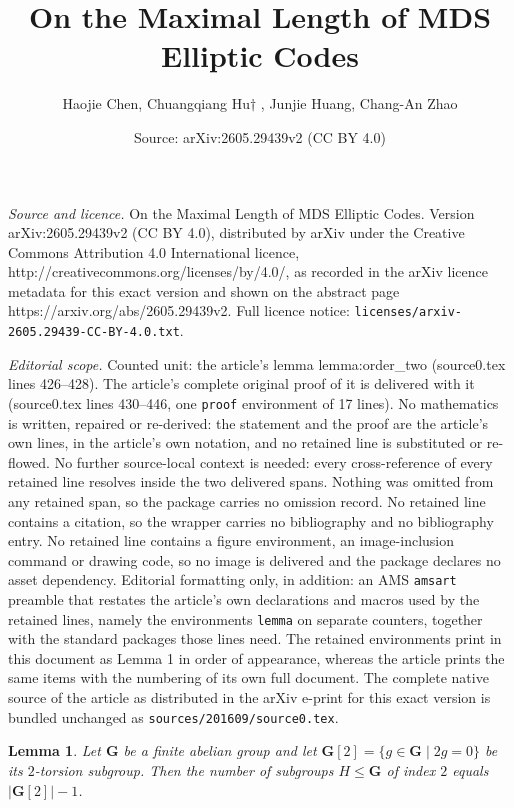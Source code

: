 \documentclass[10pt,a4paper]{amsart}
\title{On the Maximal Length of MDS Elliptic Codes}
\author{Haojie Chen, Chuangqiang Hu\(\dagger\) , Junjie Huang, Chang-An Zhao}
\date{Source: arXiv:2605.29439v2 (CC BY 4.0)}
\newtheorem{lemma}{Lemma}
\begin{document}
\maketitle

\noindent\emph{Source and licence.} On the Maximal Length of MDS Elliptic Codes. Version arXiv:2605.29439v2 (CC BY 4.0), distributed by arXiv under the Creative Commons Attribution 4.0 International licence, http://creativecommons.org/licenses/by/4.0/, as recorded in the arXiv licence metadata for this exact version and shown on the abstract page https://arxiv.org/abs/2605.29439v2. Full licence notice: \texttt{licenses/arxiv-2605.29439-CC-BY-4.0.txt}.\par\smallskip

\noindent\textit{Editorial scope.} Counted unit: the article's lemma lemma:order\_two (source0.tex lines 426--428). The article's complete original proof of it is delivered with it (source0.tex lines 430--446, one \texttt{proof} environment of 17 lines). No mathematics is written, repaired or re-derived: the statement and the proof are the article's own lines, in the article's own notation, and no retained line is substituted or re-flowed.  No further source-local context is needed: every cross-reference of every retained line resolves inside the two delivered spans.  Nothing was omitted from any retained span, so the package carries no omission record.  No retained line contains a citation, so the wrapper carries no bibliography and no bibliography entry.  No retained line contains a figure environment, an image-inclusion command or drawing code, so no image is delivered and the package declares no asset dependency.  Editorial formatting only, in addition: an AMS \texttt{amsart} preamble that restates the article's own declarations and macros used by the retained lines, namely the environments \texttt{lemma} on separate counters, together with the standard packages those lines need.  The retained environments print in this document as Lemma 1 in order of appearance, whereas the article prints the same items with the numbering of its own full document.  The complete native source of the article as distributed in the arXiv e-print for this exact version is bundled unchanged as \texttt{sources/201609/source0.tex}.
\begin{lemma}\label{lemma:order_two}
    Let $\mathbf{G}$ be a finite abelian group and let $\mathbf{G}[2] = \{g \in \mathbf{G} \mid 2g = 0\}$ be its $2$-torsion subgroup. Then the number of subgroups $H \le \mathbf{G}$ of index $2$ equals $|\mathbf{G}[2]| - 1$.
\end{lemma}
\end{document}
